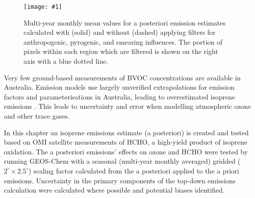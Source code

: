 \documentclass[acp, manuscript]{copernicus}
\newcommand{\parencite}{\citep}
\newcommand{\lowhr}{$2^{\circ} \times 2.5^{\circ}$}
\newcommand{\mypic}[3]{%
  \begin{figure}
    \texttt{[image: \#1]}
    \caption{#2}
    #3
  \end{figure}
}
\begin{document}
      \mypic{Figures/Sensitivity_filtering_final.png}{%
        Multi-year monthly mean values for a posteriori emission estimates calculated with (solid) and without (dashed) applying filters for anthropogenic, pyrogenic, and smearing influences.
        The portion of pixels within each region which are filtered is shown on the right axis with a blue dotted line.
      }{\label{BioIsop:uncertainty:filtering:fig_summary}}
      
    


  \label{BioIsop:conclusions}
  
  
  Very few ground-based measurements of BVOC concentrations are available in Australia.
  Emission models use largely unverified extrapolations for emission factors and parameterisations in Australia, leading to overestimated isoprene emissions \parencite{Emmerson2016}.
  This leads to uncertainty and error when modelling atmospheric ozone and other trace gases.
  
  In this chapter an isoprene emissions estimate (a posteriori) is created and tested based on OMI satellite measurements of HCHO, a high-yield product of isoprene oxidation.
  The a posteriori emissions' effects on ozone and HCHO were tested by running GEOS-Chem with a seasonal (multi-year monthly averaged) gridded (\lowhr) scaling factor calculated from the a posteriori applied to the a priori emissions.
  Uncertainty in the primary components of the top-down emissions calculation were calculated where possible and potential biases identified.
  
\end{document}
